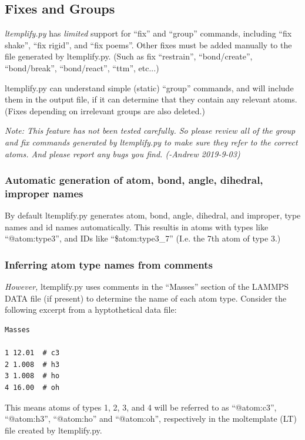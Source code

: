 \documentclass[11pt]{article}
\begin{document}
\subsection{Fixes and Groups}
\label{sec:ltemplify_fix_group}

\textit{ltemplify.py} has
\textit{limited} support for ``fix'' and ``group'' commands,
including ``fix shake'', ``fix rigid'', and ``fix poems''.
Other fixes must be added manually to the file generated by ltemplify.py.
(Such as fix ``restrain'', ``bond/create'', ``bond/break'', ``bond/react'',
 ``ttm'', etc...)

ltemplify.py can understand simple (static) ``group'' commands, and will include them in the output file, if it can determine that they contain any relevant atoms.  (Fixes depending on irrelevant groups are also deleted.)

\textit{Note: This feature has not been tested carefully.  So please review all of the group and fix commands generated by ltemplify.py to make sure they refer to the correct atoms.  And please report any bugs you find. (-Andrew 2019-9-03)}



\subsubsection*{Automatic generation of atom, bond, angle, dihedral, improper names}

By default ltemplify.py generates atom, bond, angle, dihedral, and improper,
type names and id names automatically.
This resultis in atoms with types like ``@atom:type3'', and IDs like
``\$atom:type3\_7'' (I.e. the 7th atom of type 3.)

\subsubsection*{ Inferring atom type names from comments }

\textit{However,} ltemplify.py uses comments in the ``Masses'' section of
the LAMMPS DATA file (if present) to determine the name
of each atom type.
Consider the following excerpt from a hyptothetical data file:
\begin{verbatim}
Masses

1 12.01  # c3
2 1.008  # h3
3 1.008  # ho
4 16.00  # oh
\end{verbatim}
This means atoms of types 1, 2, 3, and 4 will be referred to as
``@atom:c3'', ``@atom:h3'', ``@atom:ho'' and ``@atom:oh'',
respectively in the moltemplate (LT) file created by ltemplify.py.
\end{document}

